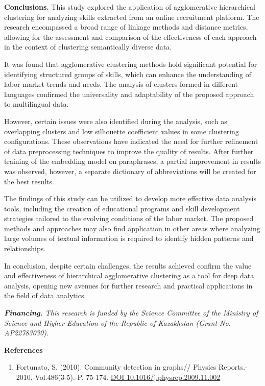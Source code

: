 {\bfseries Conclusions.} This study explored the application of
agglomerative hierarchical clustering for analyzing skills extracted
from an online recruitment platform. The research encompassed a broad
range of linkage methods and distance metrics, allowing for the
assessment and comparison of the effectiveness of each approach in the
context of clustering semantically diverse data.

It was found that agglomerative clustering methods hold significant
potential for identifying structured groups of skills, which can enhance
the understanding of labor market trends and needs. The analysis of
clusters formed in different languages confirmed the universality and
adaptability of the proposed approach to multilingual data.

However, certain issues were also identified during the analysis, such
as overlapping clusters and low silhouette coefficient values in some
clustering configurations. These observations have indicated the need
for further refinement of data preprocessing techniques to improve the
quality of results. After further training of the embedding model on
paraphrases, a partial improvement in results was observed, however, a
separate dictionary of abbreviations will be created for the best
results.

The findings of this study can be utilized to develop more effective
data analysis tools, including the creation of educational programs and
skill development strategies tailored to the evolving conditions of the
labor market. The proposed methods and approaches may also find
application in other areas where analyzing large volumes of textual
information is required to identify hidden patterns and relationships.

In conclusion, despite certain challenges, the results achieved confirm
the value and effectiveness of hierarchical agglomerative clustering as
a tool for deep data analysis, opening new avenues for further research
and practical applications in the field of data analytics.

\emph{{\bfseries Financing.} This research is funded by the Science
Committee of the Ministry of Science and Higher Education of the
Republic of Kazakhstan (Grant No. AP22783030).}

{\bfseries References}

\begin{enumerate}
\def\labelenumi{\arabic{enumi}.}
\item
  Fortunato, S. (2010). Community detection in graphs// Physics
  Reports.- 2010.-Vol.486(3-5).-P. 75-174.
  \href{https://doi.org/10.1016/j.physrep.2009.11.002}{DOI
  10.1016/j.physrep.2009.11.002}
\end{enumerate}

